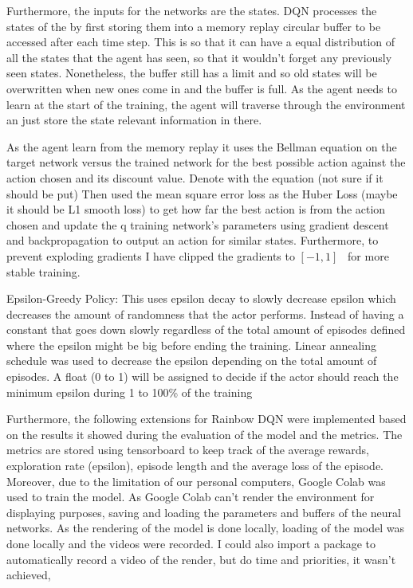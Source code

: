\documentclass{article}
\begin{document}
Furthermore, the inputs for the networks are the states.
DQN processes the states of the by first storing them into a memory replay circular buffer to be accessed after each time step.
This is so that it can have a equal distribution of all the states that the agent has seen, so that it wouldn't forget any previously seen states.
Nonetheless, the buffer still has a limit and so old states will be overwritten when new ones come in and the buffer is full.
As the agent needs to learn at the start of the training, the agent will traverse through the environment an just store the state relevant information in there.

As the agent learn from the memory replay it uses the Bellman equation on the target network versus the trained network for the best possible action against the action chosen and its discount value.
Denote with the equation (not sure if it should be put)
Then used the mean square error loss as the Huber Loss (maybe it should be L1 smooth loss) to get how far the best action is from the action chosen and update the q training network's parameters using gradient descent and backpropagation to output an action for similar states.
Furthermore, to prevent exploding gradients I have clipped the gradients to \([-1,1]\)~\cite{mnih_human-level_2015} for more stable training.



Epsilon-Greedy Policy:
This uses epsilon decay to slowly decrease epsilon which decreases the amount of randomness that the actor performs.
Instead of having a constant that goes down slowly regardless of the total amount of episodes defined where the epsilon might be big before ending the training.
Linear annealing schedule was used to decrease the epsilon depending on the total amount of episodes.
A float (0 to 1) will be assigned to decide if the actor should reach the minimum epsilon during 1 to 100\% of the training


Furthermore, the following extensions for Rainbow DQN were implemented based on the results it showed during the evaluation of the model and the metrics.
The metrics are stored using tensorboard to keep track of the average rewards, exploration rate (epsilon), episode length and the average loss of the episode.
Moreover, due to the limitation of our personal computers, Google Colab was used to train the model.
As Google Colab can't render the environment for displaying purposes, saving and loading the parameters and buffers of the neural networks.
As the rendering of the model is done locally, loading of the model was done locally and the videos were recorded.
I could also import a package to automatically record a video of the render, but do time and priorities, it wasn't achieved,
\end{document}
